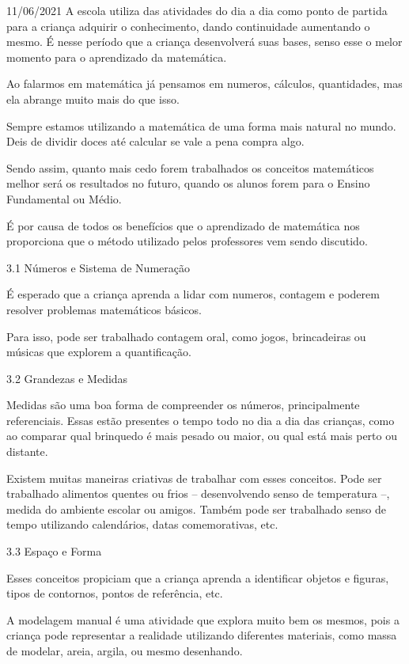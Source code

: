 \documentclass{SchoolBook}
\begin{document}
\begin{day}{11/06/2021}
        A escola utiliza das atividades do dia a dia como ponto de partida para a criança adquirir o conhecimento, dando continuidade aumentando o mesmo. É nesse período que a criança desenvolverá suas bases, senso esse o melor momento para o aprendizado da matemática.
        
        Ao falarmos em matemática já pensamos em numeros, cálculos, quantidades, mas ela abrange muito mais do que isso.
        
        Sempre estamos utilizando a matemática de uma forma mais natural no mundo. Deis de dividir doces até calcular se vale a pena compra algo.
        
        Sendo assim, quanto mais cedo forem trabalhados os conceitos matemáticos melhor será os resultados no futuro, quando os alunos forem para o Ensino Fundamental ou Médio.
        
        É por causa de todos os benefícios que o aprendizado de matemática nos proporciona que o método utilizado pelos professores vem sendo discutido.
        
        3.1 Números e Sistema de Numeração
        
        É esperado que a criança aprenda a lidar com numeros, contagem e poderem resolver problemas matemáticos básicos.
        
        Para isso, pode ser trabalhado contagem oral, como jogos, brincadeiras ou músicas que explorem a quantificação.
        
        3.2 Grandezas e Medidas
        
        Medidas são uma boa forma de compreender os números, principalmente referenciais. Essas estão presentes o tempo todo no dia a dia das crianças, como ao comparar qual brinquedo é mais pesado ou maior, ou qual está mais perto ou distante.
        
        Existem muitas maneiras criativas de trabalhar com esses conceitos. Pode ser trabalhado alimentos quentes ou frios -- desenvolvendo senso de temperatura --, medida do ambiente escolar ou amigos. Também pode ser trabalhado senso de tempo utilizando calendários, datas comemorativas, etc.
        
        3.3 Espaço e Forma
        
         Esses conceitos propiciam que a criança aprenda a identificar objetos e figuras, tipos de contornos, pontos de referência, etc.
         
         A modelagem manual é uma atividade que explora muito bem os mesmos, pois a criança pode representar a realidade utilizando diferentes materiais, como massa de modelar, areia, argila, ou mesmo desenhando.
         

\end{day}
\end{document}
